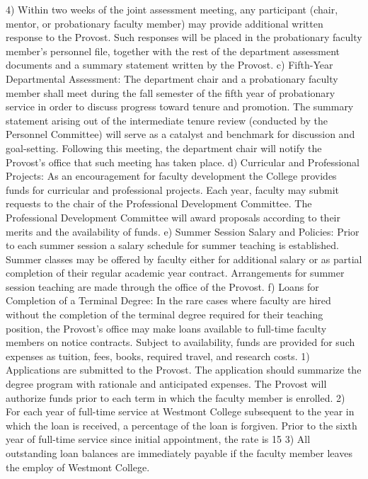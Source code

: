 \documentclass[letterpaper, 11pt]{article}
\begin{document}
			4) Within two weeks of the joint assessment meeting, any participant (chair, mentor, or probationary faculty member) may provide additional written response to the Provost.  Such responses will be placed in the probationary faculty member's personnel file, together with the rest of the department assessment documents and a summary statement written by the Provost.
			c) Fifth-Year Departmental Assessment:  The department chair and a probationary faculty member shall meet during the fall semester of the fifth year of probationary service in order to discuss progress toward tenure and promotion.  The summary statement arising out of the intermediate tenure review (conducted by the Personnel Committee) will serve as a catalyst and benchmark for discussion and goal-setting.  Following this meeting, the department chair will notify the Provost's office that such meeting has taken place.
			d) Curricular and Professional Projects:  As an encouragement for faculty development the College provides funds for curricular and professional projects.  Each year, faculty may submit requests to the chair of the Professional Development Committee. The Professional Development Committee will award proposals according to their merits and the availability of funds.
			e) Summer Session Salary and Policies:  Prior to each summer session a salary schedule for summer teaching is established.  Summer classes may be offered by faculty either for additional salary or as partial completion of their regular academic year contract. Arrangements for summer session teaching are made through the office of the Provost.
			f) Loans for Completion of a Terminal Degree:  In the rare cases where faculty are hired without the completion of the terminal degree required for their teaching position, the Provost's office may make loans available to full-time faculty members on notice contracts. Subject to availability, funds are provided for such expenses as tuition, fees, books, required travel, and research costs.
			1) Applications are submitted to the Provost.  The application should summarize the degree program with rationale and anticipated expenses.  The Provost will authorize funds prior to each term in which the faculty member is enrolled.
			2) For each year of full-time service at Westmont College subsequent to the year in which the loan is received, a percentage of the loan is forgiven.  Prior to the sixth year of full-time service since initial appointment, the rate is 15%
			3) All outstanding loan balances are immediately payable if the faculty member leaves the employ of Westmont College.
\end{document}
